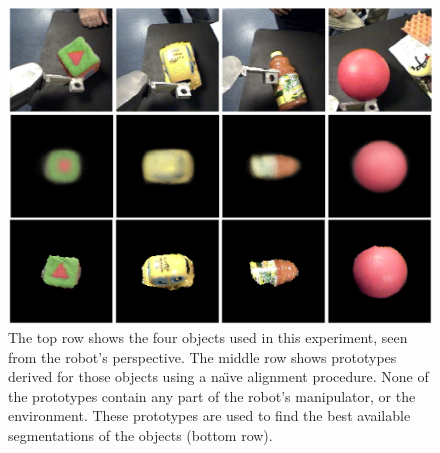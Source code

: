 %
\begin{figure}[tb]
\begin{center}
\includegraphics[width=\columnwidth]{fig-auto-proto.eps}
\caption{ 
\label{fig:auto-proto}
%
The top row shows the four objects used in this 
experiment, seen from the robot's perspective.  The 
middle row shows prototypes derived for those objects
using a na\"{\i}ve alignment procedure.  
None of the prototypes contain
any part of the robot's manipulator, or the 
environment.  These prototypes are used 
to find the best available segmentations
of the objects (bottom row).
%
}
\end{center}
\end{figure}



